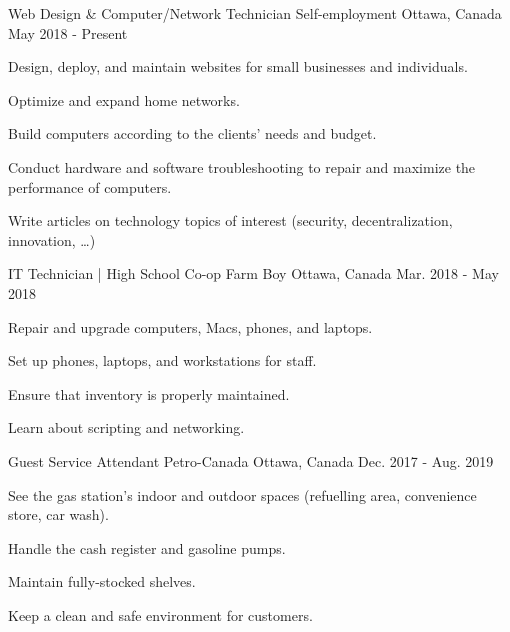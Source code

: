 \begin{cventries}
  \cventry
    {Web Design \& Computer/Network Technician} %
    {Self-employment} %
    {Ottawa, Canada} %
    {May 2018 - Present} %
    {
      \begin{cvitems} %
        \item {Design, deploy, and maintain websites for small businesses and individuals.}
        \item {Optimize and expand home networks.}
        \item {Build computers according to the clients' needs and budget.}
        \item {Conduct hardware and software troubleshooting to repair and maximize the performance of computers.}
        \item {Write articles on technology topics of interest (security, decentralization, innovation, …)}
      \end{cvitems}
    }

  \cventry
    {IT Technician | High School Co-op} %
    {Farm Boy} %
    {Ottawa, Canada} %
    {Mar. 2018 - May 2018} %
    {
      \begin{cvitems} %
        \item {Repair and upgrade computers, Macs, phones, and laptops.}
        \item {Set up phones, laptops, and workstations for staff.}
        \item {Ensure that inventory is properly maintained.}
        \item {Learn about scripting and networking.}
      \end{cvitems}
    }

  \cventry
    {Guest Service Attendant} %
    {Petro-Canada} %
    {Ottawa, Canada} %
    {Dec. 2017 - Aug. 2019} %
    {
      \begin{cvitems} %
        \item {See the gas station's indoor and outdoor spaces (refuelling area, convenience store, car wash).}
        \item {Handle the cash register and gasoline pumps.}
        \item {Maintain fully-stocked shelves.}
        \item {Keep a clean and safe environment for customers.}
      \end{cvitems}
    }

\end{cventries}
